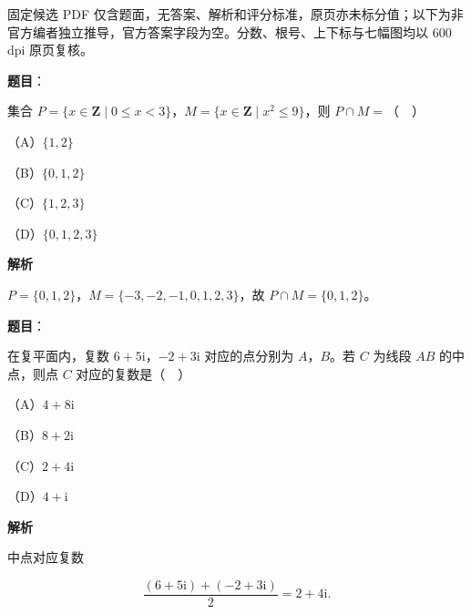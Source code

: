 

\begin{gktip}
固定候选 PDF 仅含题面，无答案、解析和评分标准，原页亦未标分值；以下为非官方编者独立推导，官方答案字段为空。分数、根号、上下标与七幅图均以 600 dpi 原页复核。
\end{gktip}

\begin{answer}

\textbf{题目}：

集合 $P=\{x\in\mathbf Z\mid0\leqslant x<3\}$，$M=\{x\in\mathbf Z\mid x^2\leqslant9\}$，则 $P\cap M=$（　）

（A）$\{1,2\}$

（B）$\{0,1,2\}$

（C）$\{1,2,3\}$

（D）$\{0,1,2,3\}$

\textbf{解析}

$P=\{0,1,2\}$，$M=\{-3,-2,-1,0,1,2,3\}$，故 $P\cap M=\{0,1,2\}$。


\end{answer}
\begin{answer}

\textbf{题目}：

在复平面内，复数 $6+5\mathrm i$，$-2+3\mathrm i$ 对应的点分别为 $A$，$B$。若 $C$ 为线段 $AB$ 的中点，则点 $C$ 对应的复数是（　）

（A）$4+8\mathrm i$

（B）$8+2\mathrm i$

（C）$2+4\mathrm i$

（D）$4+\mathrm i$

\textbf{解析}

中点对应复数

\nopagebreak[4]
\[\frac{(6+5\mathrm i)+(-2+3\mathrm i)}2=2+4\mathrm i.\]


\end{answer}
